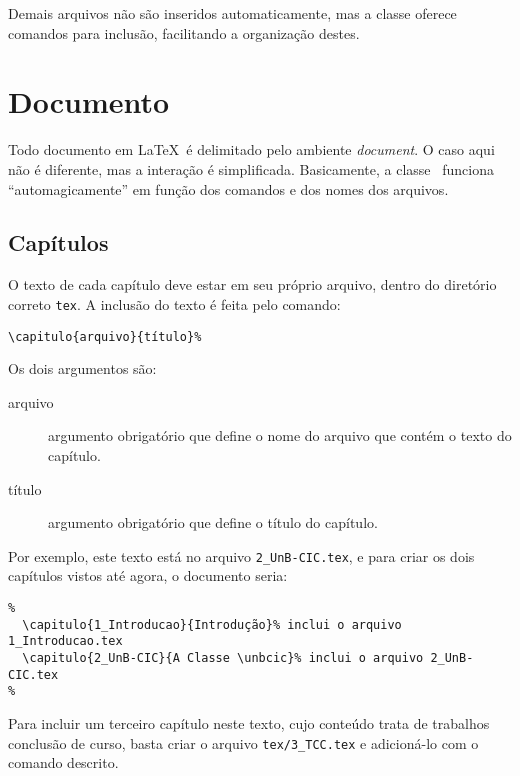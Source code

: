 Demais arquivos não são inseridos automaticamente, mas a classe oferece comandos
para inclusão, facilitando a organização destes.

\section{Documento}
Todo documento em \LaTeX\ é delimitado pelo ambiente \emph{document}. O caso aqui
não é diferente, mas a interação é simplificada. Basicamente, a classe \unbcic\
funciona ``automagicamente'' em função dos comandos e dos nomes dos arquivos.


\subsection{Capítulos}
O texto de cada capítulo deve estar em seu próprio arquivo, dentro do diretório
correto \texttt{tex}. A inclusão do texto é feita pelo comando:
\begin{verbatim}
\capitulo{arquivo}{título}%
\end{verbatim}

Os dois argumentos são:
\begin{description}%
\item[arquivo] argumento obrigatório que define o nome do arquivo que contém o
texto do capítulo.
\item[título] argumento obrigatório que define o título do capítulo.
\end{description}%

Por exemplo, este texto está no arquivo \texttt{2\_UnB-CIC.tex}, e para criar os
dois capítulos vistos até agora, o documento seria:

\begin{verbatim}
%
  \capitulo{1_Introducao}{Introdução}% inclui o arquivo 1_Introducao.tex
  \capitulo{2_UnB-CIC}{A Classe \unbcic}% inclui o arquivo 2_UnB-CIC.tex
%
\end{verbatim}

Para incluir um terceiro capítulo neste texto, cujo conteúdo trata de trabalhos
conclusão de curso, basta criar o arquivo \texttt{tex/3\_TCC.tex} e adicioná-lo
com o comando descrito.

